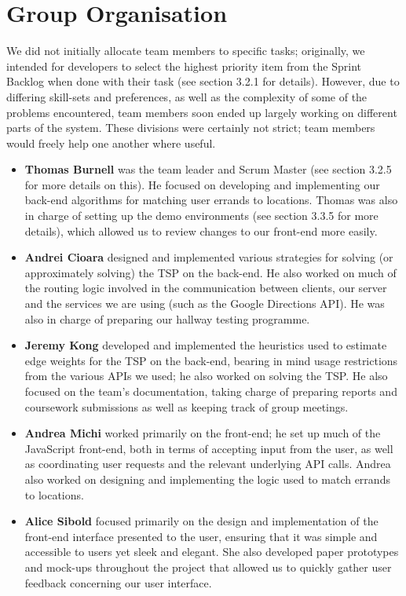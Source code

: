 \documentclass[a4paper, 10pt]{report}
\begin{document}
\section{Group Organisation}
We did not initially allocate team members to specific tasks; originally, we intended for developers to select the highest priority item from the Sprint Backlog when done with their task (see section 3.2.1 for details). However, due to differing skill-sets and preferences, as well as the complexity of some of the problems encountered, team members soon ended up largely working on different parts of the system. These divisions were certainly not strict; team members would freely help one another where useful.
\begin{itemize}
\item \textbf{Thomas Burnell} was the team leader and Scrum Master (see section 3.2.5 for more details on this). He focused on developing and implementing our back-end algorithms for matching user errands to locations. Thomas was also in charge of setting up the demo environments (see section 3.3.5 for more details), which allowed us to review changes to our front-end more easily.
\item \textbf{Andrei Cioara} designed and implemented various strategies for solving (or approximately solving) the TSP on the back-end. He also worked on much of the routing logic involved in the communication between clients, our server and the services we are using (such as the Google Directions API). He was also in charge of preparing our hallway testing programme.
\item \textbf{Jeremy Kong} developed and implemented the heuristics used to estimate edge weights for the TSP on the back-end, bearing in mind usage restrictions from the various APIs we used; he also worked on solving the TSP. He also focused on the team's documentation, taking charge of preparing reports and coursework submissions as well as keeping track of group meetings.
\item \textbf{Andrea Michi} worked primarily on the front-end; he set up much of the JavaScript front-end, both in terms of accepting input from the user, as well as coordinating user requests and the relevant underlying API calls. Andrea also worked on designing and implementing the logic used to match errands to locations.
\item \textbf{Alice Sibold} focused primarily on the design and implementation of the front-end interface presented to the user, ensuring that it was simple and accessible to users yet sleek and elegant. She also developed paper prototypes and mock-ups throughout the project that allowed us to quickly gather user feedback concerning our user interface.
\end{itemize}
\end{document}

